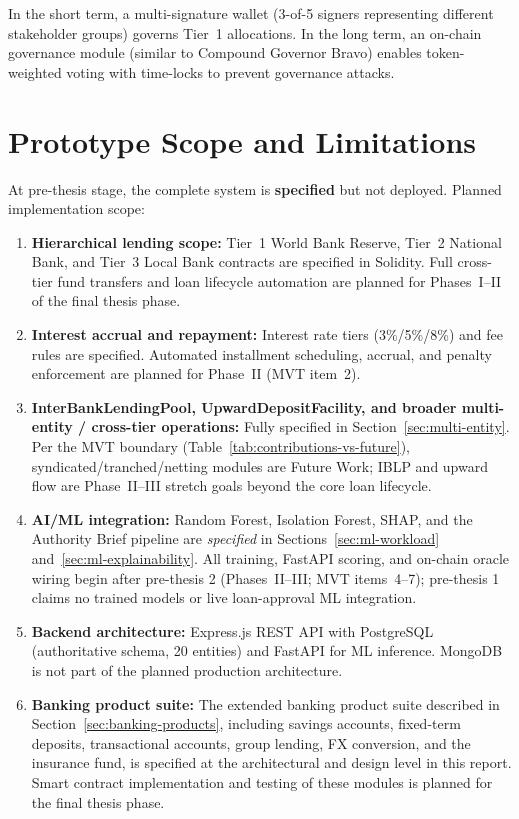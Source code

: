 \documentclass[12pt, a4paper]{report}
\begin{document}
In the short term, a multi-signature wallet (3-of-5 signers representing different stakeholder groups) governs Tier~1 allocations. In the long term, an on-chain governance module (similar to Compound Governor Bravo) enables token-weighted voting with time-locks to prevent governance attacks.

\section{Prototype Scope and Limitations}

At pre-thesis stage, the complete system is \textbf{specified} but not deployed. Planned implementation scope:

\begin{enumerate}[noitemsep]
\item \textbf{Hierarchical lending scope:} Tier~1 World Bank Reserve, Tier~2 National Bank, and Tier~3 Local Bank contracts are specified in Solidity. Full cross-tier fund transfers and loan lifecycle automation are planned for Phases~I--II of the final thesis phase.

\item \textbf{Interest accrual and repayment:} Interest rate tiers (3\%/5\%/8\%) and fee rules are specified. Automated installment scheduling, accrual, and penalty enforcement are planned for Phase~II (MVT item~2).

\item \textbf{InterBankLendingPool, UpwardDepositFacility, and broader multi-entity / cross-tier operations:} Fully specified in Section~\ref{sec:multi-entity}. Per the MVT boundary (Table~\ref{tab:contributions-vs-future}), syndicated/tranched/netting modules are Future Work; IBLP and upward flow are Phase~II--III stretch goals beyond the core loan lifecycle.

\item \textbf{AI/ML integration:} Random Forest, Isolation Forest, SHAP, and the Authority Brief pipeline are \textit{specified} in Sections~\ref{sec:ml-workload} and~\ref{sec:ml-explainability}. All training, FastAPI scoring, and on-chain oracle wiring begin after pre-thesis 2 (Phases~II--III; MVT items~4--7); pre-thesis 1 claims no trained models or live loan-approval ML integration.

\item \textbf{Backend architecture:} Express.js REST API with PostgreSQL (authoritative schema, 20 entities) and FastAPI for ML inference. MongoDB is not part of the planned production architecture.

\item \textbf{Banking product suite:} The extended banking product suite described in Section~\ref{sec:banking-products}, including savings accounts, fixed-term deposits, transactional accounts, group lending, FX conversion, and the insurance fund, is specified at the architectural and design level in this report. Smart contract implementation and testing of these modules is planned for the final thesis phase.
\end{enumerate}
\end{document}
